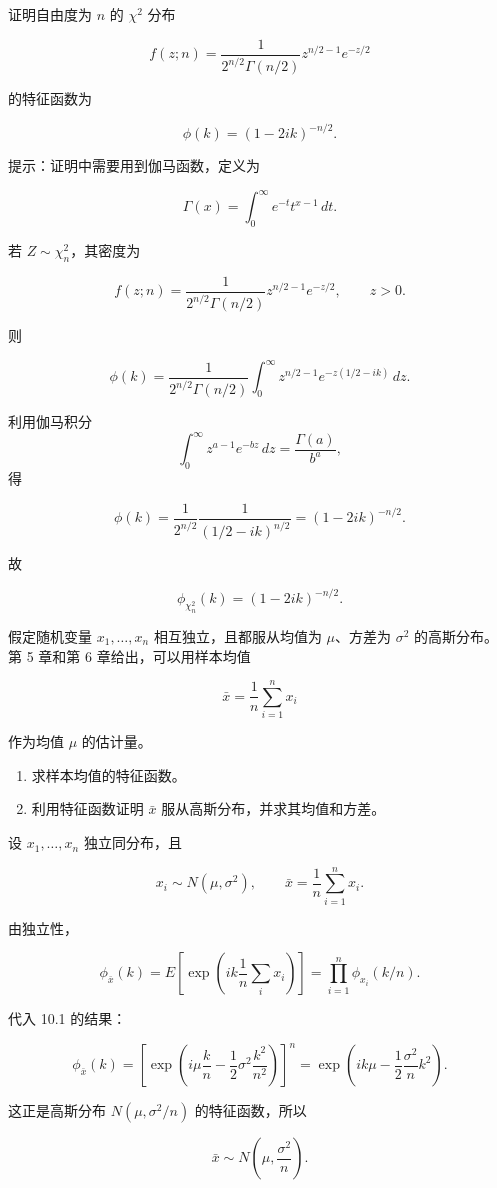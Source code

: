\begin{question}
证明自由度为 \(n\) 的 \(\chi^2\) 分布

\[
f(z;n)=\frac{1}{2^{n/2}\Gamma(n/2)}z^{n/2-1}e^{-z/2}
\]

的特征函数为

\[
\phi(k)=(1-2ik)^{-n/2}.
\]

提示：证明中需要用到伽马函数，定义为

\[
\Gamma(x)=\int_0^\infty e^{-t}t^{x-1}\,dt.
\]
\begin{solution}
若 \(Z\sim \chi^2_n\)，其密度为

\[
f(z;n)=\frac{1}{2^{n/2}\Gamma(n/2)}z^{n/2-1}e^{-z/2},\qquad z>0.
\]

则

\[
\phi(k)=\frac{1}{2^{n/2}\Gamma(n/2)}
\int_0^\infty z^{n/2-1}e^{-z(1/2-ik)}\,dz.
\]

利用伽马积分 \[
\int_0^\infty z^{a-1}e^{-bz}\,dz=\frac{\Gamma(a)}{b^a},
\] 得

\[
\phi(k)=\frac{1}{2^{n/2}}\frac{1}{(1/2-ik)^{n/2}}
=(1-2ik)^{-n/2}.
\]

故

\[
\phi_{\chi^2_n}(k)=(1-2ik)^{-n/2}.
\]
\end{solution}
\end{question}



\begin{question}
假定随机变量 \(x_1,\ldots,x_n\) 相互独立，且都服从均值为 \(\mu\)、方差为
\(\sigma^2\) 的高斯分布。第 5 章和第 6 章给出，可以用样本均值

\[
\bar x=\frac1n\sum_{i=1}^{n}x_i
\]

作为均值 \(\mu\) 的估计量。

\begin{enumerate}
\item 求样本均值的特征函数。

\item 利用特征函数证明 \(\bar x\) 服从高斯分布，并求其均值和方差。
\end{enumerate}
\begin{solution}
设 \(x_1,\dots,x_n\) 独立同分布，且

\[
x_i\sim N(\mu,\sigma^2),\qquad \bar x=\frac1n\sum_{i=1}^n x_i.
\]

由独立性，

\[
\phi_{\bar x}(k)
=E\!\left[\exp\!\left(ik\frac1n\sum_i x_i\right)\right]
=\prod_{i=1}^n \phi_{x_i}(k/n).
\]

代入 10.1 的结果：

\[
\phi_{\bar x}(k)
=\left[\exp\!\left(i\mu\frac{k}{n}-\frac12\sigma^2\frac{k^2}{n^2}\right)\right]^n
=\exp\!\left(ik\mu-\frac12\frac{\sigma^2}{n}k^2\right).
\]

这正是高斯分布 \(N(\mu,\sigma^2/n)\) 的特征函数，所以

\[
\bar x\sim N\!\left(\mu,\frac{\sigma^2}{n}\right).
\]
\end{solution}
\end{question}



